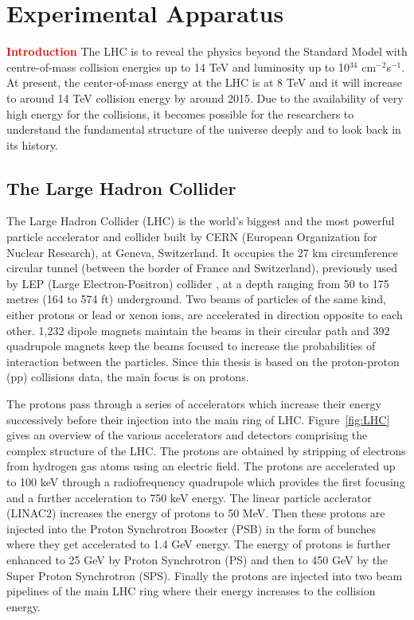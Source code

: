 \chapter{Experimental Apparatus}
\label{chap:Detector}
\textcolor{red}{\bf \large {Introduction}}
The LHC is to reveal the physics beyond the Standard Model with centre-of-mass collision energies up to 14 TeV and luminosity up to 10$^{34}$ cm$^{-2}$s$^{-1}$. At present, the center-of-mass energy at the LHC is at 8 TeV and it will increase to around 14 TeV collision energy by around 2015. Due to the availability of very high energy for the collisions, it becomes possible for the researchers to understand the fundamental structure of the universe deeply and to look back in its history. 

\section{The Large Hadron Collider}
The Large Hadron Collider (LHC) \cite{Evans:2008zzb} is the world's biggest and the most powerful particle accelerator and collider built by CERN (European Organization for Nuclear Research), at Geneva, Switzerland. It occupies the 27 km circumference circular tunnel (between the border of France and Switzerland), previously used by LEP (Large Electron-Positron) collider \cite{LEP}, at a depth ranging from 50 to 175 metres (164 to 574 ft) underground. Two beams of particles of the same kind, either protons or lead or xenon ions, are accelerated in direction opposite to each other. 1,232 dipole magnets maintain the beams in their circular path and 392 quadrupole magnets keep the beams focused to increase the probabilities of interaction between the particles. Since this thesis is based on the proton-proton (pp) collisions data, the main focus is on protons. 

The protons pass through a series of accelerators which increase their energy successively before their injection into the main ring of LHC. Figure~\ref{fig:LHC} gives an overview of the various accelerators and detectors comprising the complex structure of the LHC. The protons are obtained by stripping of electrons from hydrogen gas atoms using an electric field. The protons are accelerated up to 100 keV through a radiofrequency quadrupole which provides the first focusing and a further acceleration to 750 keV energy. The linear particle acclerator (LINAC2) increases the energy of protons to 50 MeV. Then these protons are injected into the Proton Synchrotron Booster (PSB) in the form of bunches where they get accelerated to 1.4 GeV energy. The energy of protons is further enhanced to 25 GeV by Proton Synchrotron (PS) and then to 450 GeV by the Super Proton Synchrotron (SPS). Finally the protons are injected into two beam pipelines of the main LHC ring where their energy increases to the collision energy. 

